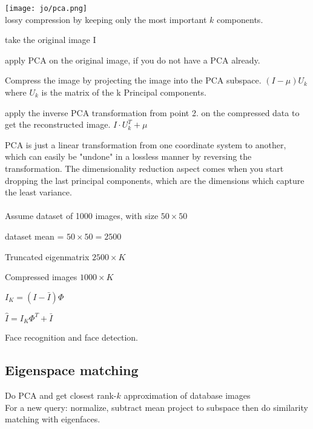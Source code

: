 \texttt{[image: jo/pca.png]}\\
 lossy compression by keeping only the most important $k$ components.
\begin{compactitem}
\item take the original image I
\item apply PCA on the original image, if you do not have a PCA already.
\item Compress the image by projecting the image into the PCA subspace. $(I - \mu)U_k$ where $U_k$ is the matrix of the k Principal components.
\item apply the inverse PCA 
transformation from point 2. on the compressed data to get the reconstructed image. $I \cdot U_k^T + \mu$

\end{compactitem}
PCA is just a linear transformation from one coordinate system to another, which can easily be "undone" in a lossless manner by reversing the transformation. The dimensionality reduction aspect comes when you start dropping the last principal components, which are the dimensions which capture the least variance.\\
\BoxStart
{} \\
Assume dataset of 1000 images, with size $50 \times 50$
\begin{compactenum}
    \item dataset mean = $50 \times 50 = 2500$
    \item Truncated eigenmatrix $2500 \times K$
    \item Compressed images $1000 \times K$
    \item $I_K = (I - \bar{I})\Phi$
    \item $\hat{I} = I_K \Phi^T + \bar{I}$
\end{compactenum}
\BoxEnd
Face recognition  and face detection.
\subsection*{Eigenspace matching}
Do PCA  and get closest rank-$k$ approximation of database images  \\
For a new query: normalize, subtract mean  project to subspace then do similarity matching with eigenfaces.
